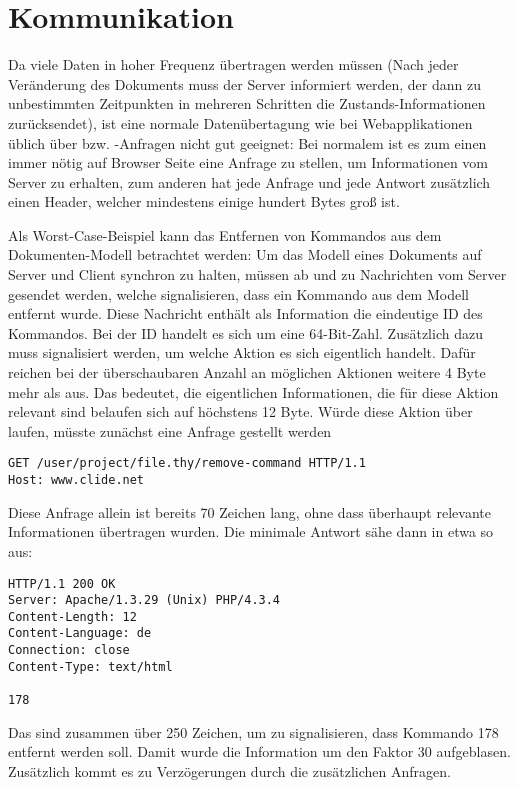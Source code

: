 \section{Kommunikation}
\label{sec:comm}

Da viele Daten in hoher Frequenz übertragen werden müssen (Nach jeder Veränderung des Dokuments
muss der Server informiert werden, der dann zu unbestimmten Zeitpunkten in mehreren Schritten die
Zustands-Informationen zurücksendet), ist eine normale Datenübertagung wie bei Webapplikationen
üblich über  bzw. -Anfragen nicht gut geeignet: Bei normalem  ist es
zum einen immer nötig auf Browser Seite eine Anfrage zu stellen, um Informationen vom Server zu
erhalten, zum anderen hat jede Anfrage und jede Antwort zusätzlich einen Header, welcher mindestens
einige hundert Bytes groß ist.

Als Worst-Case-Beispiel kann das Entfernen von Kommandos aus dem Dokumenten-Modell betrachtet
werden: Um das Modell eines Dokuments auf Server und Client synchron zu halten, müssen ab und zu
Nachrichten vom Server gesendet werden, welche signalisieren, dass ein Kommando aus dem Modell
entfernt wurde. Diese Nachricht enthält als Information die eindeutige ID des Kommandos. Bei der ID
handelt es sich um eine 64-Bit-Zahl. Zusätzlich dazu muss signalisiert werden, um welche Aktion es
sich eigentlich handelt. Dafür reichen bei der überschaubaren Anzahl an möglichen Aktionen weitere 4
Byte mehr als aus. Das bedeutet, die eigentlichen Informationen, die für diese Aktion relevant sind
belaufen sich auf höchstens 12 Byte. Würde diese Aktion über  laufen, müsste zunächst eine
Anfrage gestellt werden

\begin{lstlisting}
GET /user/project/file.thy/remove-command HTTP/1.1
Host: www.clide.net
\end{lstlisting}

Diese Anfrage allein ist bereits 70 Zeichen lang, ohne dass überhaupt relevante Informationen
übertragen wurden. Die minimale Antwort sähe dann in etwa so aus:

\begin{lstlisting}
HTTP/1.1 200 OK
Server: Apache/1.3.29 (Unix) PHP/4.3.4
Content-Length: 12
Content-Language: de
Connection: close
Content-Type: text/html

178
\end{lstlisting}

Das sind zusammen über 250 Zeichen, um zu signalisieren, dass Kommando 178 entfernt werden soll.
Damit wurde die Information um den Faktor 30 aufgeblasen. Zusätzlich kommt es zu Verzögerungen durch
die zusätzlichen Anfragen. 

